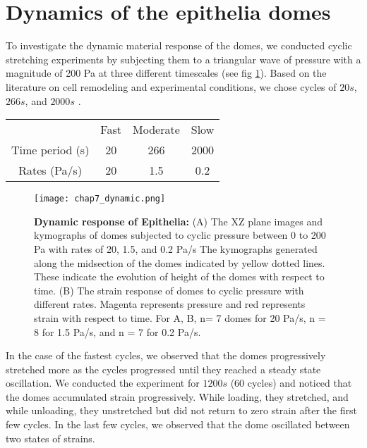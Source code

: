 \hypertarget{dynamics-of-the-epithelia-domes}{%
	\section{Dynamics of the epithelia
		domes}\label{dynamics-of-the-epithelia-domes}}
	

To investigate the dynamic material response of the domes, we conducted cyclic stretching experiments by subjecting them to a triangular wave of pressure with a magnitude of 200 Pa at three different timescales (see fig \ref{fig_7_6}). Based on the literature on cell remodeling and experimental conditions, we chose cycles of $20 s$, $266 s$, and $2000 s$ \cite{wyatt2016, khalilgharibi2019, casares2015}.

\begin{center}
	\begin{table}[h!]
		\begin{tabular}{c c c c}
			& Fast & Moderate & Slow \\ 
			Time period (s) & 20   & 266      & 2000 \\ 
			Rates (Pa/s)    & 20   & 1.5      & 0.2  \\ 
		\end{tabular}
	\end{table}
\end{center}

\begin{figure}[h!]
	\centering
	\texttt{[image: chap7\_dynamic.png]}
	\caption{\label{fig_7_6} \textbf{Dynamic response of Epithelia:} (A) The XZ plane images and kymographs of domes subjected to cyclic pressure between 0 to 200 Pa with rates of 20, 1.5, and 0.2 Pa/s The kymographs generated along the midsection of the domes indicated by yellow dotted lines. These indicate the evolution of height of the domes with respect to time. (B) The strain response of domes to cyclic pressure with different rates. Magenta represents pressure and red represents strain with respect to time. For A, B, n= 7 domes for 20 Pa/s, n = 8 for 1.5 Pa/s, and n = 7 for 0.2 Pa/s. 
	}
\end{figure}

In the case of the fastest cycles, we observed that the domes progressively stretched more as the cycles progressed until they reached a steady state oscillation. We conducted the experiment for $1200 s$ (60 cycles) and noticed that the domes accumulated strain progressively. While loading, they stretched, and while unloading, they unstretched but did not return to zero strain after the first few cycles. In the last few cycles, we observed that the dome oscillated between two states of strains.

